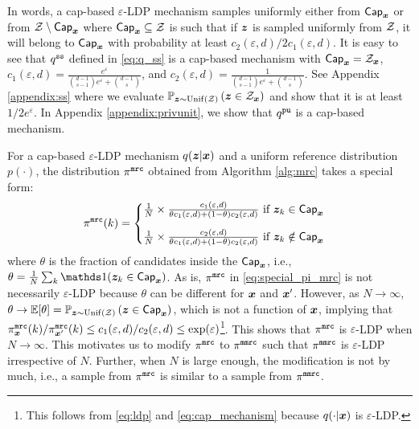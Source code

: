In words, a cap-based $\varepsilon$-LDP mechanism samples uniformly either from $\mathsf{Cap}_{{\boldsymbol{x}}}$ or from $\mathcal{Z} \setminus \mathsf{Cap}_{{\boldsymbol{x}}}$ where $\mathsf{Cap}_{{\boldsymbol{x}}} \subseteq \mathcal{Z}$ is such that if ${\boldsymbol{z}}$ is sampled uniformly from $\mathcal{Z}$, it will belong to $\mathsf{Cap}_{{\boldsymbol{x}}}$ with probability at least $c_2(\varepsilon, d) / 2 c_1(\varepsilon, d)$. 
It is easy to see that $q^{\texttt{ss}}$ defined in \eqref{eq:q_ss} is a cap-based mechanism with $\mathsf{Cap}_{{\boldsymbol{x}}} = \mathcal{Z}_{{\boldsymbol{x}}}$, $c_1(\varepsilon, d) = \frac{e^{\varepsilon}}{{ \binom{d-1}{s-1} }e^{\varepsilon}+{ \binom{d-1}{s} }}$, and $c_2(\varepsilon, d) = \frac{1}{{ \binom{d-1}{s-1} }e^{\varepsilon}+{ \binom{d-1}{s} }}$. See Appendix \ref{appendix:ss} where we evaluate $\mathbb{P}_{{\boldsymbol{z}} \sim \mathrm{Unif}(\mathcal{Z})}\left( {\boldsymbol{z}} \in \mathcal{Z}_{{\boldsymbol{x}}} \right)$ and show that it is at least $ 1/2e^{\varepsilon}$. In Appendix \ref{appendix:privunit}, we show that $q^{\texttt{pu}}$ is a cap-based mechanism.

For a cap-based $\varepsilon$-LDP mechanism $q({\boldsymbol{z}} | {\boldsymbol{x}})$ and a uniform reference distribution $p(\cdot)$, the distribution $\pi^{\texttt{mrc}}$ obtained from Algorithm \ref{alg:mrc} takes a special form:
\begin{align}
   \piMRC(k) =
  \begin{cases}
     \frac{1}{N} \times \frac{c_1(\varepsilon, d)}{\theta c_1(\varepsilon, d) + (1 - \theta) c_2(\varepsilon, d)} \ \text{if}\ \svbz_k \in \msf{Cap}_{\svbx}
      \\[10pt]
     \frac{1}{N} \times \frac{c_2(\varepsilon, d)}{\theta c_1(\varepsilon, d) + (1 - \theta) c_2(\varepsilon, d)} \ \text{if}\ \svbz_k \notin \msf{Cap}_{\svbx}
    \end{cases}\label{eq:special_pi_mrc}
\end{align}
where $\theta$ is the fraction of candidates inside the $\mathsf{Cap}_{{\boldsymbol{x}}}$, i.e.,  $\theta = \frac{1}{N} \sum_{k} \Indicator(\svbz_k \in \msf{Cap}_{\svbx})$. As is, $\pi^{\texttt{mrc}}$ in \eqref{eq:special_pi_mrc} is not necessarily $\varepsilon$-LDP because $\theta$ can be different for ${\boldsymbol{x}}$ and ${\boldsymbol{x}}'$. However, as $N \to \infty$, $\theta \to  \mathbb{E}[\theta] = \mathbb{P}_{{\boldsymbol{z}} \sim \mathrm{Unif}(\mathcal{Z})}\left( {\boldsymbol{z}} \in \mathsf{Cap}_{{\boldsymbol{x}}} \right)$, which is not a function of ${\boldsymbol{x}}$, implying that $\pi^{\texttt{mrc}}_{{\boldsymbol{x}}}(k) / \pi^{\texttt{mrc}}_{{\boldsymbol{x}}'}(k) \leq c_1(\varepsilon,d)/c_2(\varepsilon, d) \leq \exp(\varepsilon)$\footnote{This follows from \eqref{eq:ldp} and \eqref{eq:cap_mechanism} because $q(\cdot | {\boldsymbol{x}})$ is $\varepsilon$-LDP.}. This shows that $\pi^{\texttt{mrc}}$ is $\varepsilon$-LDP when $N \to \infty$. This motivates us to modify $\pi^{\texttt{mrc}}$ to $\pi^{\texttt{mmrc}}$ such that $\pi^{\texttt{mmrc}}$ is $\varepsilon$-LDP irrespective of $N$. Further, when $N$ is large enough, the modification is not by much, i.e., a sample from $\pi^{\texttt{mrc}}$ is similar to a sample from $\pi^{\texttt{mmrc}}$.

